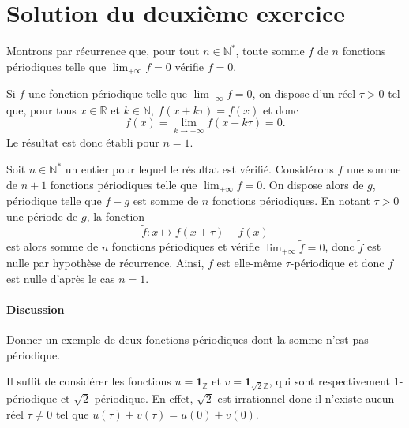 \section{Solution du deuxième exercice}

Montrons par récurrence que, pour tout $n \in \mathbb N^*$, toute somme $f$ de $n$
fonctions périodiques telle que $\lim_{+\infty} f = 0$ vérifie $f = 0$.

Si $f$ une fonction périodique telle que $\lim_{+\infty} f = 0$, on
dispose d'un réel $\tau > 0$ tel que, pour tous $x \in \mathbb R$ et $k \in
\mathbb N,\ f(x+k\tau) = f(x)$ et donc
$$
f(x) = \lim_{k\to +\infty} f(x + k\tau) = 0.
$$
Le résultat est donc établi pour $n = 1$.

Soit $n \in \mathbb N^*$ un entier pour lequel le résultat est
  vérifié.
  Considérons $f$ une somme de $n+1$ fonctions périodiques
  telle que $\lim_{+\infty} f = 0$.  On dispose alors de $g$,
  périodique telle que $f- g$ est somme de $n$ fonctions
  périodiques.  En notant $\tau > 0$ une période de $g$, la fonction
    $$
        \tilde f : x\longmapsto f(x+\tau) - f(x)
    $$
  est alors somme de $n$ fonctions périodiques et vérifie
  $\lim_{+\infty} \tilde f =0$,
  donc $\tilde f$ est nulle par hypothèse de récurrence. Ainsi, $f$ est
  elle-même $\tau$-périodique et donc $f$ est nulle d'après le cas $n = 1$.

\paragraph{Discussion}

Donner un exemple de deux fonctions périodiques dont la somme
n'est pas périodique.

Il suffit de considérer les fonctions $u = \mathbf 1_{\mathbb Z}$ et $v = \mathbf
1_{\sqrt 2 \mathbb Z}$, qui sont respectivement $1$-périodique et $\sqrt 2$-périodique. En effet, $\sqrt 2$ est irrationnel donc il n'existe aucun réel $\tau \neq 0$ tel que
$u(\tau) + v(\tau) = u(0) + v(0)$.
